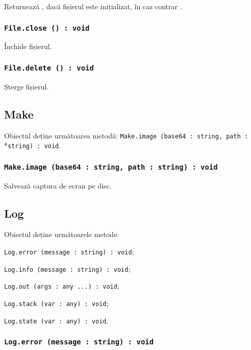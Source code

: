 Returnează \true, dacă fișierul este inițializat, în caz contrar \false.

\subsubsection{\texttt{File.close () : void}}

Închide fișierul.

\subsubsection{\texttt{File.delete () : void}}

Șterge fișierul.

\subsection{Make}

Obiectul \make{} deține următoarea metodă: \texttt{Make.image (base64 : string, path :}\\*\texttt{string) : void}.

\subsubsection{\texttt{Make.image (base64 : string, path : string) : void}}

Salvează captura de ecran pe disc.

\subsection{Log}

Obiectul \logtype{} deține următoarele metode:
\begin{icItems}
	\item \texttt{Log.error (message : string) : void};
	\item \texttt{Log.info (message : string) : void};
	\item \texttt{Log.out (args : any ...) : void};
	\item \texttt{Log.stack (var : any) : void};
	\item \texttt{Log.state (var : any) : void}.
\end{icItems}

\subsubsection{\texttt{Log.error (message : string) : void}}

